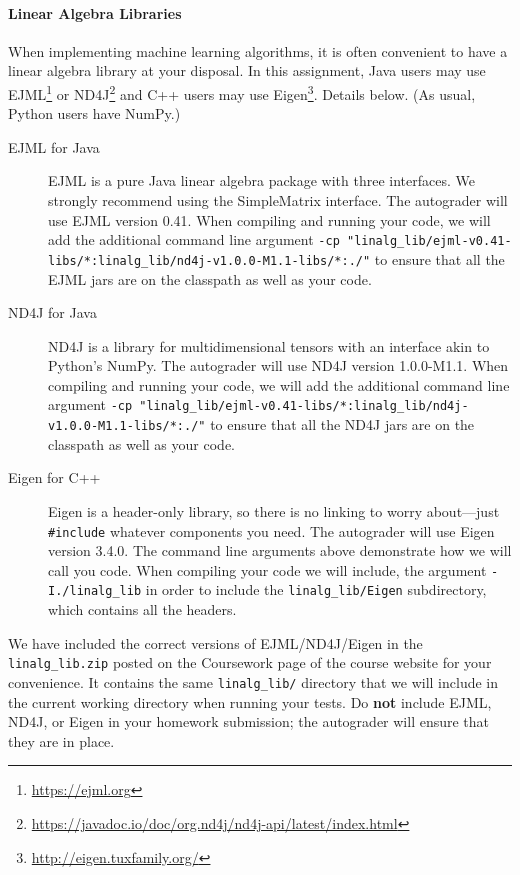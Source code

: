 \documentclass[11pt,addpoints,answers]{exam}
\begin{document}
\begin{notebox}
\paragraph{Linear Algebra Libraries} When implementing machine learning algorithms, it is often convenient to have a linear algebra library at your disposal. In this assignment, Java users may use EJML\footnote{\url{https://ejml.org}} or ND4J\footnote{\url{https://javadoc.io/doc/org.nd4j/nd4j-api/latest/index.html}} and C++ users may use Eigen\footnote{\url{http://eigen.tuxfamily.org/}}. Details below. 
%
(As usual, Python users have NumPy.)
%
\begin{description}
\item[EJML for Java] EJML is a pure Java linear algebra package with three interfaces. We strongly recommend using the SimpleMatrix interface. The autograder will use EJML version 0.41. When compiling and running your code, we will add the additional command line argument {\footnotesize{\lstinline{-cp "linalg_lib/ejml-v0.41-libs/*:linalg_lib/nd4j-v1.0.0-M1.1-libs/*:./"}}}
to ensure that all the EJML jars are on the classpath as well as your code. 

\item[ND4J for Java] ND4J is a library for multidimensional tensors with an interface akin to Python's NumPy. The autograder will use ND4J version 1.0.0-M1.1. When compiling and running your code, we will add the additional command line argument {\footnotesize{\lstinline{-cp "linalg_lib/ejml-v0.41-libs/*:linalg_lib/nd4j-v1.0.0-M1.1-libs/*:./"}}} to ensure that all the ND4J jars are on the classpath as well as your code. 

\item[Eigen for C++] Eigen is a header-only library, so there is no linking to worry about---just \lstinline{#include} whatever components you need. The autograder will use Eigen version 3.4.0. The command line arguments above demonstrate how we will call you code. When compiling your code we will include, the argument \lstinline{-I./linalg_lib} in order to include the \lstinline{linalg_lib/Eigen} subdirectory, which contains all the headers.

\end{description} 
We have included the correct versions of EJML/ND4J/Eigen in the \lstinline{linalg_lib.zip} posted on the Coursework page of the course website for your convenience. It contains the same \lstinline{linalg_lib/} directory that we will include in the current working directory when running your tests. Do {\bf not} include EJML, ND4J, or Eigen in your homework submission; the autograder will ensure that they are in place. 
\end{notebox}\clearpage
\end{document}
